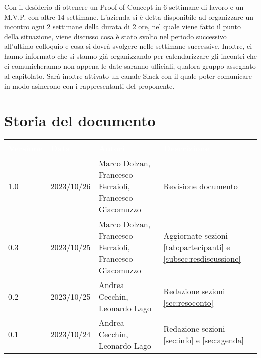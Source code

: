 \documentclass[12pt]{article}
\begin{document}
\begin{enumerate}
Con il desiderio di ottenere un Proof of Concept in 6 settimane di lavoro e un M.V.P. con altre 14 settimane. L'azienda si è detta disponibile ad organizzare un incontro ogni 2 settimane della durata di 2 ore, nel quale viene fatto il punto della situazione, viene discusso cosa è stato svolto nel periodo successivo all'ultimo colloquio e cosa si dovrà svolgere nelle settimane successive. Inoltre, ci hanno informato che si stanno già organizzando per calendarizzare gli incontri che ci comunicheranno non appena le date saranno ufficiali, qualora gruppo assegnato al capitolato.
Sarà inoltre attivato un canale Slack con il quale poter comunicare in modo asincrono con i rappresentanti del proponente.
    
\end{enumerate}

\section{Storia del documento} \label{sec:storia}
\begingroup
\setlength{\tabcolsep}{10pt}
\renewcommand{\arraystretch}{1.5}
\begin{tabularx}{\textwidth}{| l | l | X | X |}
    \hline
    \rowcolor{headerrow} \textbf{\textcolor{white}{Versione}} & \textbf{\textcolor{white}{Data}} & \textbf{\textcolor{white}{Autori}} & \textbf{\textcolor{white}{Descrizione}} \\
    \hline
    1.0 & 2023/10/26 & Marco Dolzan, Francesco Ferraioli, Francesco Giacomuzzo & Revisione documento\\
    \hline
    0.3 & 2023/10/25 &Marco Dolzan, Francesco Ferraioli, Francesco Giacomuzzo & Aggiornate sezioni \ref{tab:partecipanti} e \ref{subsec:resdiscussione} \\
    \hline
    0.2 & 2023/10/25 & Andrea Cecchin, Leonardo Lago & Redazione sezioni \ref{sec:resoconto} \\
    \hline
    0.1 & 2023/10/24 & Andrea Cecchin, Leonardo Lago  & Redazione sezioni \ref{sec:info} e \ref{sec:agenda}\\
    \hline
    
    
   
\end{tabularx}
\endgroup
\end{document}

